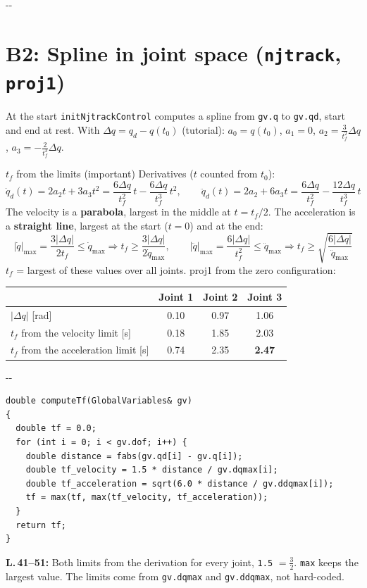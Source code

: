 \documentclass[10pt,a4paper]{article}
\makeatletter
\newcommand{\secneed}[1]{\par\penalty\@M\begingroup\setlength{\dimen@}{#1}\dimen@ii\pagegoal
  \advance\dimen@ii-\pagetotal\ifdim\dimen@>\dimen@ii\ifdim\dimen@ii>\z@\vfil\fi\penalty-\@M\fi\endgroup}
\let\oldsection\section
\renewcommand{\section}{\secneed{9\baselineskip}\oldsection}
\newcommand{\code}[1]{\texttt{#1}}
\makeatother
\begin{document}
\section{B2: Spline in joint space (\code{njtrack}, \code{proj1})}

At the start \code{initNjtrackControl} computes a spline from \code{gv.q} to \code{gv.qd}, start and end at rest.
With $\Delta q = q_d - q(t_0)$ (tutorial):
$a_0 = q(t_0)$, $a_1 = 0$, $a_2 = \frac{3}{t_f^2}\Delta q$, $a_3 = -\frac{2}{t_f^3}\Delta q$.

\begin{herleitung}{\texorpdfstring{$t_f$}{tf} from the limits (important)}
Derivatives ($t$ counted from $t_0$):
\[
  \dot q_d(t) = 2a_2 t + 3a_3 t^2 = \frac{6\Delta q}{t_f^2}\,t - \frac{6\Delta q}{t_f^3}\,t^2, \qquad
  \ddot q_d(t) = 2a_2 + 6a_3 t = \frac{6\Delta q}{t_f^2} - \frac{12\Delta q}{t_f^3}\,t
\]
The velocity is a \textbf{parabola}, largest in the middle at $t = t_f/2$. The acceleration is a \textbf{straight line},
largest at the start ($t = 0$) and at the end:
\[
  |\dot q|_{\max} = \frac{3|\Delta q|}{2t_f} \le \dot q_{\max} \Rightarrow t_f \ge \frac{3|\Delta q|}{2\dot q_{\max}},
  \qquad
  |\ddot q|_{\max} = \frac{6|\Delta q|}{t_f^2} \le \ddot q_{\max} \Rightarrow t_f \ge \sqrt{\frac{6|\Delta q|}{\ddot q_{\max}}}
\]
$t_f$ = largest of these values over all joints. proj1 from the zero configuration:

\centering
{\small
\begin{tabular}{lccc}
  \toprule
  & Joint 1 & Joint 2 & Joint 3 \\
  \midrule
  $|\Delta q|$ [rad] & 0.10 & 0.97 & 1.06 \\
  $t_f$ from the velocity limit [s] & 0.18 & 1.85 & 2.03 \\
  $t_f$ from the acceleration limit [s] & 0.74 & 2.35 & \textbf{2.47} \\
  \bottomrule
\end{tabular}
}
\end{herleitung}

\secneed{11\baselineskip}
\begin{lstlisting}[firstnumber=41]
double computeTf(GlobalVariables& gv)
{
  double tf = 0.0;
  for (int i = 0; i < gv.dof; i++) {
    double distance = fabs(gv.qd[i] - gv.q[i]);
    double tf_velocity = 1.5 * distance / gv.dqmax[i];
    double tf_acceleration = sqrt(6.0 * distance / gv.ddqmax[i]);
    tf = max(tf, max(tf_velocity, tf_acceleration));
  }
  return tf;
}
\end{lstlisting}
\textbf{L.\,41--51:} Both limits from the derivation for every joint, \code{1.5} $= \frac{3}{2}$. \code{max} keeps the
largest value. The limits come from \code{gv.dqmax} and \code{gv.ddqmax}, not hard-coded.
\end{document}
